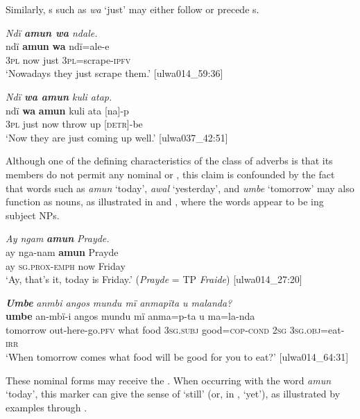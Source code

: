 Similarly, s such as \textit{wa} ‘just’ may either follow  or precede  s.

\ea%
    \label{ex:otherwc:48}
        \textit{Ndï \textbf{amun wa} ndale.}\\
\gll    ndï  \textbf{amun}  \textbf{wa}  ndï=ale-e\\
    3\textsc{pl}  now  just  \textsc{3pl}=scrape-\textsc{ipfv}\\
\glt `Nowadays they just scrape them.’ [ulwa014\_59:36]
\z

\ea%
    \label{ex:otherwc:49}
          \textit{Ndï \textbf{wa amun} kuli atap.}\\
\gll    ndï \textbf{wa}  \textbf{amun}  kuli  ata  [na]-p\\
    3\textsc{pl}  just  now  throw  up  [\textsc{detr]-}be\\
\glt `Now they are just coming up well.’ [ulwa037\_42:51]
\z

Although one of the defining characteristics of the class of adverbs is that its members do not permit any nominal or , this claim is confounded by the fact that words such as \textit{amun} ‘today’, \textit{awal} ‘yesterday’, and \textit{umbe} ‘tomorrow’ may also function as nouns, as illustrated in  and , where the  words appear to be ing subject NPs.

\ea%
    \label{ex:otherwc:50}
          \textit{Ay ngam} \textbf{\textit{amun}} \textit{Prayde.}\\
\gll    ay  nga-nam      \textbf{amun}  Prayde\\
    ay  \textsc{sg.prox{}-emph} now  Friday\\
\glt `Ay, that’s it, today is Friday.’ (\textit{Prayde} = TP \textit{Fraide}) [ulwa014\_27:20]
\z

\ea%
    \label{ex:otherwc:51}
          \textbf{\textit{Umbe}} \textit{anmbi angos mundu mï anmapïta u malanda?}\\
\gll    \textbf{umbe}    an-mbï-i      angos  mundu  mï anma=p-ta      u    ma=la-nda\\
    tomorrow  out-here-go.\textsc{pfv}  what  food  \textsc{3sg.subj}    good=\textsc{cop}{}-\textsc{cond}  \textsc{2sg}  3\textsc{sg.obj}=eat-\textsc{irr}\\
\glt `When tomorrow comes what food will be good for you to eat?’ [ulwa014\_64:31]
\z

These nominal forms may receive the . When occurring with the word \textit{amun} ‘today’, this marker can give the sense of ‘still’ (or, in  , ‘yet’), as illustrated by examples  through .


